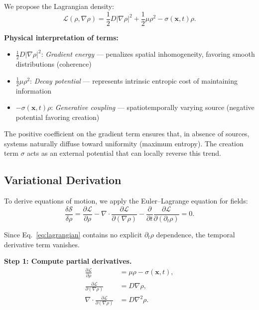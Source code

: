 \documentclass[12pt]{article}
\begin{document}
We propose the Lagrangian density:
\begin{equation}
    \mathcal{L}(\rho, \nabla\rho) = \frac{1}{2} D |\nabla \rho|^2 + \frac{1}{2}\mu \rho^2 - \sigma(\mathbf{x},t) \rho.
    \label{eq:lagrangian}
\end{equation}

\textbf{Physical interpretation of terms:}
\begin{itemize}
    \item $\frac{1}{2}D|\nabla\rho|^2$: \emph{Gradient energy} --- penalizes spatial inhomogeneity, favoring smooth distributions (coherence)
    \item $\frac{1}{2}\mu\rho^2$: \emph{Decay potential} --- represents intrinsic entropic cost of maintaining information
    \item $-\sigma(\mathbf{x},t)\rho$: \emph{Generative coupling} --- spatiotemporally varying source (negative potential favoring creation)
\end{itemize}

The positive coefficient on the gradient term ensures that, in absence of sources, systems naturally diffuse toward uniformity (maximum entropy). The creation term $\sigma$ acts as an external potential that can locally reverse this trend.

\subsection{Variational Derivation}

To derive equations of motion, we apply the Euler--Lagrange equation for fields:
\begin{equation}
    \frac{\delta \mathcal{S}}{\delta \rho} = \frac{\partial \mathcal{L}}{\partial \rho} - \nabla \cdot \frac{\partial \mathcal{L}}{\partial(\nabla\rho)} - \frac{\partial}{\partial t}\frac{\partial \mathcal{L}}{\partial(\partial_t\rho)} = 0.
    \label{eq:euler_lagrange}
\end{equation}

Since Eq.~\eqref{eq:lagrangian} contains no explicit $\partial_t\rho$ dependence, the temporal derivative term vanishes.

\textbf{Step 1: Compute partial derivatives.}
\begin{align}
    \frac{\partial \mathcal{L}}{\partial \rho} &= \mu \rho - \sigma(\mathbf{x},t), \\
    \frac{\partial \mathcal{L}}{\partial(\nabla\rho)} &= D \nabla\rho, \\
    \nabla \cdot \frac{\partial \mathcal{L}}{\partial(\nabla\rho)} &= D \nabla^2 \rho.
\end{align}
\end{document}
